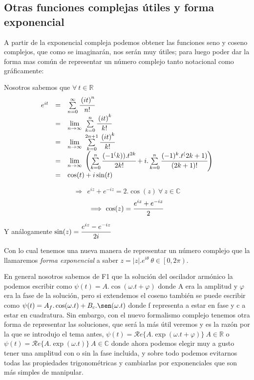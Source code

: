 \documentclass[a4paper,spanish]{article}
\def\Rea {\mathcal{R}e}
\def\C {\mathbb{C}}
\def\R {\mathbb{R}}
\numberwithin{equation}{section}
\begin{document}
\subsection{Otras funciones complejas \'utiles y forma exponencial}

A partir de la exponencial compleja podemos obtener las funciones seno y coseno complejos, que como se imaginar\'an, nos ser\'an muy \'utiles; para luego poder dar la forma mas com\'un de representar un n\'umero complejo tanto notacional como gr\'aficamente:

Nosotros sabemos que $\forall \ t \in \R $
\[ 
\begin{array}{rcl}
e^{it} & = & \sum\limits_{n=0}^{\infty}
\cfrac{\left(it\right)^n}{n!} \\
& = & \lim\limits_{n \rightarrow \infty} \ \sum\limits_{k=0}^{n} \cfrac{\left(it\right)^k}{k!} \\
& = & \lim\limits_{n \rightarrow \infty} \ \sum\limits_{k=0}^{2n+1} \cfrac{\left(it\right)^k}{k!} \\
& = & \lim\limits_{n \rightarrow \infty} \ \left( \sum\limits _{k=0}^{n} \cfrac{(-1^(k)).t^{2k}}{2k!}
+i. \sum\limits_{k=0}^{n} \cfrac{(-1)^k.t^(2k+1)}{(2k+1)!} \right) \\
& = & \cos(t)+i\sin(t)
\end{array}
\]

\[\Longrightarrow\ \ e^{iz} + e^{-iz} = 2. \cos(z) \ \forall \ z\in\C\]
\[\Longrightarrow\ \cos (z) = \cfrac{e^{iz} + e^{-iz}}{2}\]

Y an\'alogamente $\sin(z) = \cfrac{e^{iz} - e^{-iz}}{2i}$

Con lo cual tenemos una nueva manera de representar un n\'umero complejo que la llamaremos \textit{forma exponencial} a saber
$z=\vert{z}\vert.e^{i\theta} \ \theta\in\left[0,2\pi\right)$.

En general nosotros sabemos de F1 que la soluci\'on del oscilador
arm\'onico la podemos escribir como $\psi (t) = A. \cos (\omega .t
+ \varphi )$ donde A era la amplitud y $\varphi$ era la fase de la
soluci\'on, pero si extendemos el coseno tambi\'en se puede escribir
como $\psi (t) = A_f. \cos (\omega .t) + B_c. \sen (\omega .t)$
donde f representa a estar en fase y c a estar en cuadratura. Sin
embargo, con el nuevo formalismo complejo tenemos otra forma de
representar las soluciones, que ser\'a la m\'as \'util veremos y
es la raz\'on por la que se introdujo el tema antes, $\psi (t) =
\Rea \lbrace{A. \exp(\omega .t + \varphi )}\rbrace \ A \in \R$ o $\psi (t) = \Rea \lbrace{A. \exp(\omega .t)}\rbrace \ A \in \C$ donde ahora podemos elegir muy a
gusto tener una amplitud con o sin la fase incluida, y sobre todo
podemos evitarnos todas las propiedades trigonom\'etricas y
cambiarlas por exponenciales que son m\'as simples de manipular.
\end{document}
